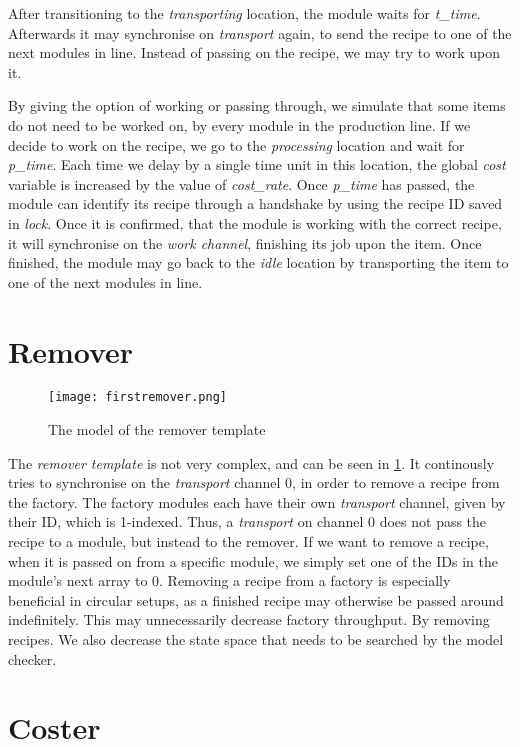 After transitioning to the \emph{transporting} location, the module waits for \emph{t\_time}. Afterwards it may synchronise on \emph{transport} again, to send the recipe to one of the next modules in line. Instead of passing on the recipe, we may try to work upon it.

By giving the option of working or passing through, we simulate that some items do not need to be worked on, by every module in the production line. If we decide to work on the recipe, we go to the \emph{processing} location and wait for \emph{p\_time}. Each time we delay by a single time unit in this location, the global \emph{cost} variable is increased by the value of \emph{cost\_rate}. Once \emph{p\_time} has passed, the module can identify its recipe through a handshake by using the recipe ID saved in \emph{lock}. Once it is confirmed, that the module is working with the correct recipe, it will synchronise on the \emph{work channel}, finishing its job upon the item. Once finished, the module may go back to the \emph{idle} location by transporting the item to one of the next modules in line.

\section{Remover}
\label{subs:remover}

\begin{figure}[h]
\centering
\texttt{[image: firstremover.png]}
\caption{The model of the remover template}
\label{fig:firstremover}
\end{figure}

The \emph{remover template} is not very complex, and can be seen in \cref{fig:firstremover}. It continously tries to synchronise on the \emph{transport} channel 0, in order to remove a recipe from the factory. The factory modules each have their own \emph{transport} channel, given by their ID, which is 1-indexed. Thus, a \emph{transport} on channel 0 does not pass the recipe to a module, but instead to the remover. If we want to remove a recipe, when it is passed on from a specific module, we simply set one of the IDs in the module’s next array to 0. Removing a recipe from a factory is especially beneficial in circular setups, as a finished recipe may otherwise be passed around indefinitely. This may unnecessarily decrease factory throughput. By removing recipes. We also decrease the state space that needs to be searched by the model checker.

\section{Coster}
\label{subs:coster}

